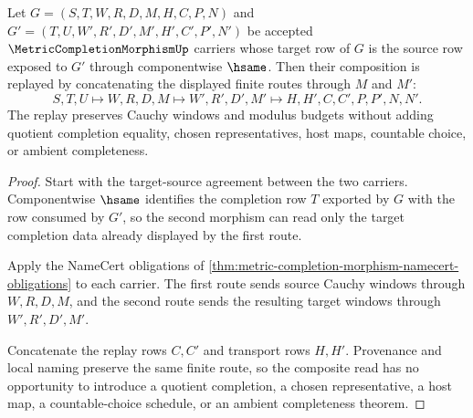 \begin{theorem}
\label{thm:metric-completion-morphism-composition-replay}
Let $G=(S,T,W,R,D,M,H,C,P,N)$ and $G'=(T,U,W',R',D',M',H',C',P',N')$ be accepted $\MetricCompletionMorphismUp$ carriers whose target row of $G$ is the source row exposed to $G'$ through componentwise $\hsame$. Then their composition is replayed by concatenating the displayed finite routes through $M$ and $M'$:
$$
S,T,U \longmapsto W,R,D,M \longmapsto W',R',D',M' \longmapsto H,H',C,C',P,P',N,N' .
$$
The replay preserves Cauchy windows and modulus budgets without adding quotient completion equality, chosen representatives, host maps, countable choice, or ambient completeness.
\end{theorem}
\begin{proof}
Start with the target-source agreement between the two carriers. Componentwise $\hsame$ identifies the completion row $T$ exported by $G$ with the row consumed by $G'$, so the second morphism can read only the target completion data already displayed by the first route.

Apply the NameCert obligations of \autoref{thm:metric-completion-morphism-namecert-obligations} to each carrier. The first route sends source Cauchy windows through $W,R,D,M$, and the second route sends the resulting target windows through $W',R',D',M'$.

Concatenate the replay rows $C,C'$ and transport rows $H,H'$. Provenance and local naming preserve the same finite route, so the composite read has no opportunity to introduce a quotient completion, a chosen representative, a host map, a countable-choice schedule, or an ambient completeness theorem.
\end{proof}



